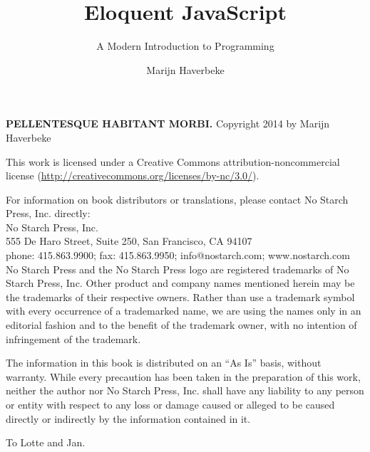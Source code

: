 \documentclass[cfonts]{nostarch}
\begin{document}
\frontmatter

\author{Marijn Haverbeke}

\title{Eloquent JavaScript}

\subtitle{A Modern Introduction to Programming}

\makehalftitle

\maketitle

\begin{copyrightpage}
  \textbf{\sffamily\MakeUppercase{Pellentesque habitant morbi.}}
  Copyright \textcopyright{} 2014 by Marijn Haverbeke

  This work is licensed under a Creative Commons
  attribution-noncommercial license
  (\url{http://creativecommons.org/licenses/by-nc/3.0/}).

For information on book distributors or translations, please contact
No Starch Press, Inc. directly: \\
No Starch Press, Inc.\\
555 De Haro Street, Suite 250, San Francisco, CA 94107\\
phone: 415.863.9900; fax: 415.863.9950; info@nostarch.com; www.nostarch.com\\

No Starch Press and the No Starch Press logo are registered trademarks
of No Starch Press, Inc. Other product and company names mentioned
herein may be the trademarks of their respective owners. Rather than
use a trademark symbol with every occurrence of a trademarked name, we
are using the names only in an editorial fashion and to the benefit of
the trademark owner, with no intention of infringement of the
trademark.

The information in this book is distributed on an ``As Is'' basis,
without warranty. While every precaution has been taken in the
preparation of this work, neither the author nor No Starch Press, Inc.
shall have any liability to any person or entity with respect to any
loss or damage caused or alleged to be caused directly or indirectly
by the information contained in it.

\end{copyrightpage}

\begin{dedicationpage}
To Lotte and Jan.
\end{dedicationpage}

\brieftableofcontents
\end{document}
